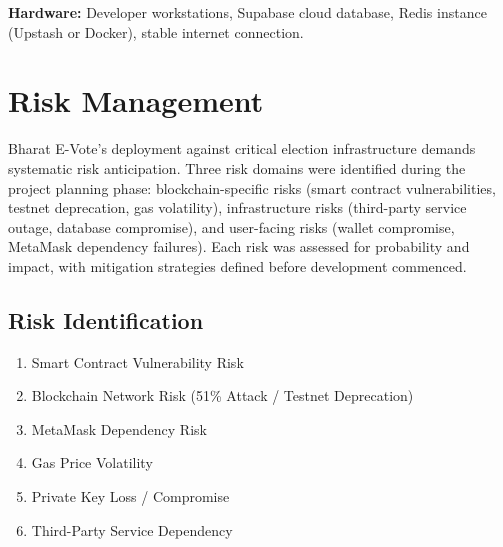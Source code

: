\documentclass[oneside,a4paper,12pt]{book}
\begin{document}
\textbf{Hardware:} Developer workstations, Supabase cloud database, Redis instance (Upstash or Docker), stable internet connection.

\section{Risk Management}
Bharat E-Vote's deployment against critical election infrastructure demands systematic risk anticipation. Three risk domains were identified during the project planning phase: blockchain-specific risks (smart contract vulnerabilities, testnet deprecation, gas volatility), infrastructure risks (third-party service outage, database compromise), and user-facing risks (wallet compromise, MetaMask dependency failures). Each risk was assessed for probability and impact, with mitigation strategies defined before development commenced.

\subsection{Risk Identification}
\begin{enumerate}[leftmargin=1.5cm]
    \item Smart Contract Vulnerability Risk
    \item Blockchain Network Risk (51\% Attack / Testnet Deprecation)
    \item MetaMask Dependency Risk
    \item Gas Price Volatility
    \item Private Key Loss / Compromise
    \item Third-Party Service Dependency
\end{enumerate}
\end{document}
